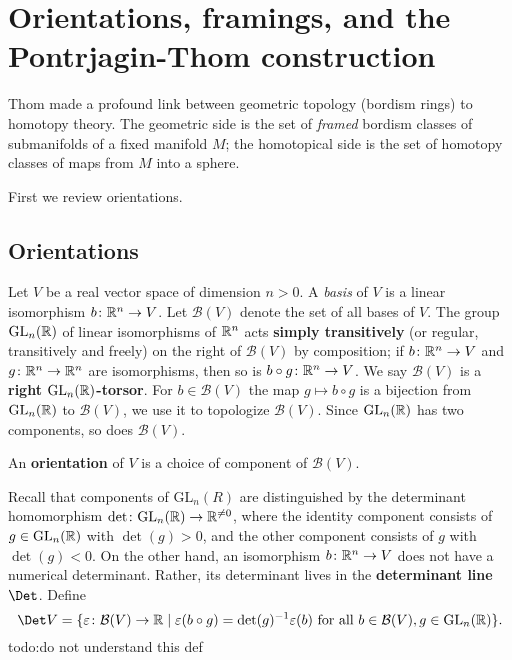 \section{Orientations, framings, and the Pontrjagin-Thom construction} 
Thom made a profound link between geometric topology (bordism rings) to homotopy theory. The geometric side is the set of \emph{framed} bordism classes of submanifolds of a fixed manifold $M$; the homotopical side is the set of homotopy classes of maps from $M$ into a sphere.

First we review orientations.
\subsection{Orientations}
Let $V$ be a real vector space of dimension $n>0$. A \emph{basis} of $V$ is a linear isomorphism $b \colon \mathbb{R}^n  \to V$. Let $\mathcal{B} (V)$ denote the set of all bases of $V$. The group $\mathrm{GL}_n (\mathbb{R})$ of linear isomorphisms of $\mathbb{R}^n $ acts \textbf{simply transitively} (or regular, transitively and freely) on the right of $\mathcal{B} (V)$ by composition; if $b \colon \mathbb{R}^n  \to V$ and $g  \colon \mathbb{R}^n  \to \mathbb{R}^n $ are isomorphisms, then so is $b \circ g \colon \mathbb{R}^n  \to V$. We say $\mathcal{B} (V)$ is a \textbf{right} $\mathrm{GL}_n (\mathbb{R})$\textbf{-torsor}. For $b \in \mathcal{B} (V)$ the map $g \mapsto b \circ g$ is a bijection from $\mathrm{GL}_n (\mathbb{R})$ to $\mathcal{B} (V)$, we use it to topologize $\mathcal{B} (V)$. Since $\mathrm{GL}_n (\mathbb{R})$ has two components, so does $\mathcal{B} (V)$.
   \begin{definition}[]
       An \textbf{orientation} of $V$ is a choice of component of $\mathcal{B} (V)$.
   \end{definition} 
   Recall that components of $\mathrm{GL}_n (R)$ are distinguished by the determinant homomorphism $\det \colon \mathrm{GL}_n (\mathbb{R}) \to \mathbb{R}^{\neq 0}$, where the identity component consists of $g \in \mathrm{GL}_n (\mathbb{R})$ with $\det(g) >0$, and the other component consists of $g$ with $\det(g) <0$. On the other hand, an isomorphism $b \colon \mathbb{R}^n  \to V$ does not have a numerical determinant. Rather, its determinant lives in the \textbf{determinant line} $\Det $. Define \[
       \Det V= \{\varepsilon  \colon \mathcal{B} (V) \to \R \mid \varepsilon (b \circ g)=\det (g)^{-1}\varepsilon (b) \ \text{for all} \ b \in \mathcal{B} (V), g \in \mathrm{GL}_n (\R)\} .
   \] {\color{red}todo:do not understand this def} 
